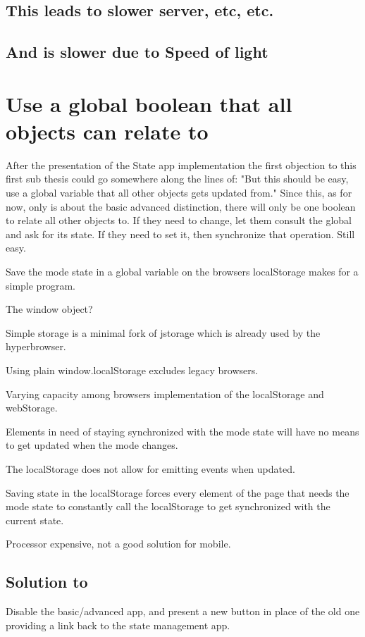 \documentclass[english]{ifimaster}
\begin{document}
\subsection{This leads to slower server, etc, etc.}
\subsection{And is slower due to Speed of light}

\section{Use a global boolean that all objects can relate to}
After the presentation of the State app implementation the first objection to this first sub thesis could go somewhere along the lines of: "But this should be easy, use a global variable that all other objects gets updated from." Since this, as for now, only is about the basic advanced distinction, there will only be one boolean to relate all other objects to. If they need to change, let them consult the global and ask for its state. If they need to set it, then synchronize that operation. Still easy.

Save the mode state in a global variable on the browsers localStorage makes for a simple program.

The window object?

Simple storage is a minimal fork of jstorage which is already used by the hyperbrowser.

Using plain window.localStorage excludes legacy browsers.

Varying capacity among browsers implementation of the localStorage and webStorage.

Elements in need of staying synchronized with the mode state will have no means to get updated when the mode changes.

The localStorage does not allow for emitting events when updated.

Saving state in the localStorage forces every element of the page that needs the mode state to constantly call the localStorage to get synchronized with the current state.

Processor expensive, not a good solution for mobile.

\subsection{Solution to } 
Disable the basic/advanced app, and present a new button in place of the old one providing a link back to the state management app.
\end{document}
